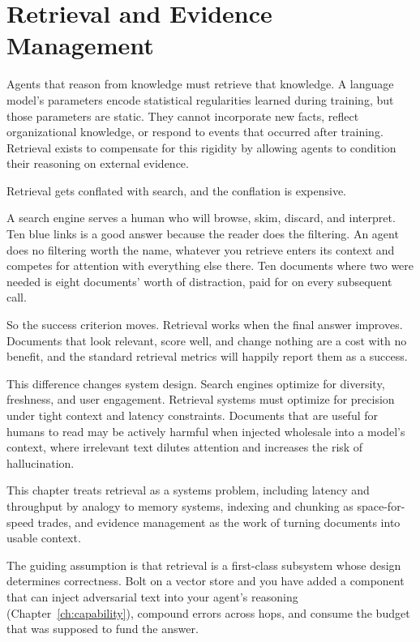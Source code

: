 \chapter{Retrieval and Evidence Management}
\label{ch:retrieval}

Agents that reason from knowledge must retrieve that knowledge. A language model’s parameters encode statistical regularities learned during training, but those parameters are static. They cannot incorporate new facts, reflect organizational knowledge, or respond to events that occurred after training. Retrieval exists to compensate for this rigidity by allowing agents to condition their reasoning on external evidence.

Retrieval gets conflated with search, and the conflation is expensive.

A search engine serves a human who will browse, skim, discard, and interpret. Ten
blue links is a good answer because the reader does the filtering. An agent does
no filtering worth the name, whatever you retrieve enters its context and
competes for attention with everything else there. Ten documents where two were
needed is eight documents' worth of distraction, paid for on every subsequent
call.

So the success criterion moves. Retrieval works when the final answer improves.
Documents that look relevant, score well, and change nothing are a cost with no
benefit, and the standard retrieval metrics will happily report them as a
success.

This difference changes system design. Search engines optimize for diversity, freshness, and user engagement. Retrieval systems must optimize for precision under tight context and latency constraints. Documents that are useful for humans to read may be actively harmful when injected wholesale into a model’s context, where irrelevant text dilutes attention and increases the risk of hallucination.

This chapter treats retrieval as a systems problem, including latency and throughput by
analogy to memory systems, indexing and chunking as space-for-speed trades, and
evidence management as the work of turning documents into usable context.

The guiding assumption is that retrieval is a first-class subsystem whose design
determines correctness. Bolt on a vector store and you have added a component that
can inject adversarial text into your agent's reasoning
(Chapter~\ref{ch:capability}), compound errors across hops, and consume the budget
that was supposed to fund the answer.

